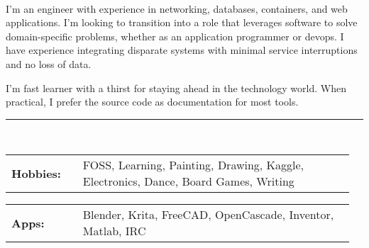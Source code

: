 \documentclass[10pt,letterpaper]{article}
\newcommand{\tzlarrow}{(0,0) -- (0.2,0) -- (0.3,0.2) -- (0.2,0.4) -- (0,0.4) -- (0.1,0.2) -- cycle;}
\newcommand{\larrow}[1]
{\begin{tikzpicture}[scale=0.58]
	 \filldraw[fill=#1!100,draw=#1!100!black]  \tzlarrow
 \end{tikzpicture}
}
\newcommand{\metasection}[2]{
	\begin{tabular*}{1\linewidth}{p{0.20\linewidth} p{0.76\linewidth}}
		\larrow{bgcol}\normalsize{\textbf{\textcolor{sectcol}{#1}}}&#2\\
	\end{tabular*}
}
\newcommand{\spread}{7pt}
\begin{document}
\pagestyle{fancy}

\begin{minipage}[t]{0.485\textwidth}



\vspace{\spread}

\hspace{-0.25\linewidth}\colorbox{bgcol}{}
\setlength{\parindent}{5mm}

\vspace{-0.1cm}\\
\small{I'm an engineer with experience in networking, databases, containers,
and web applications. I'm looking to transition into a role that
leverages software to solve domain-specific problems, whether as an
application programmer or devops. I have experience integrating
disparate systems with minimal service interruptions and no loss of data.}

\small{I'm fast learner with a thirst for staying ahead in the technology world.
When practical, I prefer the source code as documentation for most tools.}\\[-2pt]
\textcolor{softcol}{\hrule}
\setlength{\parindent}{0mm}
\vspace{\spread}\\
\metasection{Hobbies:}{FOSS, Learning, Painting, Drawing, Kaggle, Electronics, Dance, Board Games, Writing}
\metasection{Apps:}{Blender, Krita, FreeCAD, OpenCascade, Inventor, Matlab, IRC}
\end{minipage}
\hfill
\end{document}
